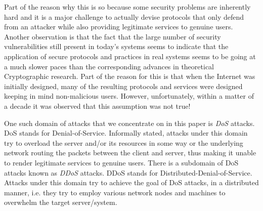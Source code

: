 \documentclass[10pt,twocolumn,letterpaper]{article}
\begin{document}
Part of the reason why this is so because some security problems are inherently hard and it is a major challenge to actually devise protocols that only defend from an attacker while also providing legitimate services to genuine users. 
Another observation is that the fact that the large number of security vulnerabilities still present in today's systems seems to indicate that the application of secure protocols and practices in real systems seems to be going at a much slower paces than the corresponding advances in theoretical Cryptographic research. 
Part of the reason for this is that when the Internet was initially designed, many of the resulting protocols and services were designed keeping in mind non-malicious users. However, unfortunately, within a matter of a decade it was observed that this assumption was not true! 

One such domain of attacks that we concentrate on in this paper is \textit{DoS} attacks. DoS stands for Denial-of-Service. Informally stated, attacks under this domain try to overload the server and/or its resources in some way or the underlying network routing the packets between the client and server, thus making it unable to render legitimate services to genuine users. There is a subdomain of DoS attacks known as \textit{DDoS} attacks. DDoS stands for Distributed-Denial-of-Service. Attacks under this domain try to achieve the goal of DoS attacks, in a distributed manner, i.e. they try to employ various network nodes and machines to overwhelm the target server/system.
\end{document}
